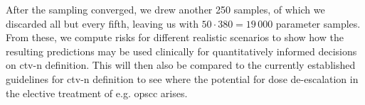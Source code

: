 \documentclass[\relativeRoot/main.tex]{subfiles}
\begin{document}
After the sampling converged, we drew another 250 samples, of which we discarded all but every fifth, leaving us with $50 \cdot 380 = 19\,000$ parameter samples. From these, we compute risks for different realistic scenarios to show how the resulting predictions may be used clinically for quantitatively informed decisions on \gls{ctv-n} definition. This will then also be compared to the currently established guidelines for \gls{ctv-n} definition to see where the potential for dose de-escalation in the elective treatment of e.g. \gls{opscc} arises.









\end{document}

